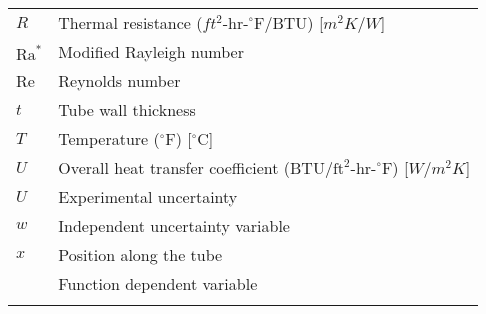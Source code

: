 \begin{nomenclature}
		\begin{tabular}{p{2cm} p{12cm}}
		$R$ \dotfill & Thermal resistance ($ft^2\mbox{-hr-}^\circ\mbox{F}/\mbox{BTU}$) [$m^2K/W$] \\
		$\mbox{Ra}^*$ \dotfill & Modified Rayleigh number \\
		Re \dotfill & Reynolds number \\
		$t$ \dotfill & Tube wall thickness \\
		$T$ \dotfill & Temperature ($^\circ$F) [$^\circ$C] \\
		$U$ \dotfill & Overall heat transfer coefficient ($\mbox{BTU}/\mbox{ft}^2\mbox{-hr-}^\circ\mbox{F}$) [$W/m^2K$] \\
		$U$ \dotfill & Experimental uncertainty \\
		$w$ \dotfill & Independent uncertainty variable \\
		$x$ \dotfill & Position along the tube \\
		& Function dependent variable \\
		& \\



\end{tabular}
\end{nomenclature}
